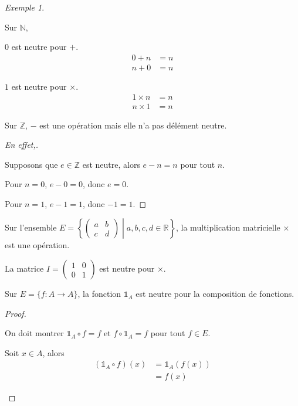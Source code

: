 \documentclass{report}
\newcommand*{\reels}{\mathbb{R}}
\newcommand*{\entiers}{\mathbb{Z}}
\newcommand*{\naturels}{\mathbb{N}}
\newcommand*{\identite}{\mathds{1}}
\theoremstyle{definition}
\theoremstyle{remark}
\newtheorem*{exem}{Exemple}
\begin{document}
	\begin{exem}~

		Sur $\naturels$,

		\begin{ulist}
			\item $0$ est neutre pour $+$.
			\begin{align*}
				0+n&=n\\
				n+0&=n
			\end{align*}
			\item $1$ est neutre pour $\times$.
			\begin{align*}
				1 \times n&=n\\
				n \times 1&=n
			\end{align*}
		\end{ulist}

		Sur $\entiers$, $-$ est une op\'eration mais elle n'a pas d\'el\'ement neutre.
		\renewcommand{\qedsymbol}{\lightning}
		\begin{proof}[En effet,]~

			Supposons que $e \in \entiers$ est neutre, alors $e-n=n$ pour tout $n$.

			Pour $n=0$, $e-0=0$, donc $e=0$.

			Pour $n=1$, $e-1=1$, donc $-1=1$.
		\end{proof}
		\renewcommand{\qedsymbol}{$\square$}
		\begin{ulist}
			\item Sur l'ensemble $E=\left\lbrace \left( \begin{array}{cc}
				a&b\\c&d
			\end{array}\right) \middle| a,b,c,d \in \reels\right\rbrace$, la multiplication matricielle $\times$ est une op\'eration.

			La matrice $I=\left( \begin{array}{cc}
				1&0\\0&1
			\end{array}\right)$ est neutre pour $\times$.
			\item Sur $E=\{f:A \to A\}$, la fonction $\identite_A$ est neutre pour la composition de fonctions.
			\begin{proof}~

				On doit montrer $\identite_A \circ f=f$ et $f \circ \identite_A=f$ pour tout $f \in E$.
				\begin{nlist}
					\item Soit $x \in A$, alors
					\begin{align*}
						(\identite_A \circ f)(x)&= \identite_A(f(x))\\
						&= f(x)
					\end{align*}


\end{nlist}
\end{proof}
\end{ulist}
\end{exem}
\end{document}

